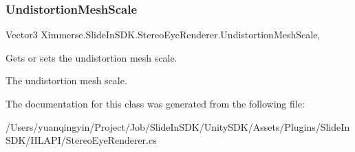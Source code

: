 \subsubsection{\texorpdfstring{Undistortion\+Mesh\+Scale}{UndistortionMeshScale}}
{\footnotesize\ttfamily Vector3 Ximmerse.\+Slide\+In\+S\+D\+K.\+Stereo\+Eye\+Renderer.\+Undistortion\+Mesh\+Scale\hspace{0.3cm}{\ttfamily [get]}, {\ttfamily [set]}}



Gets or sets the undistortion mesh scale. 

The undistortion mesh scale.

The documentation for this class was generated from the following file\+:\begin{DoxyCompactItemize}
\item 
/\+Users/yuanqingyin/\+Project/\+Job/\+Slide\+In\+S\+D\+K/\+Unity\+S\+D\+K/\+Assets/\+Plugins/\+Slide\+In\+S\+D\+K/\+H\+L\+A\+P\+I/Stereo\+Eye\+Renderer.\+cs\end{DoxyCompactItemize}
